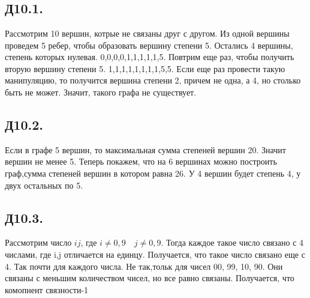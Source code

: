 

	\section*{}
	\subsection*{Д10.1.}
	Рассмотрим 10 вершин, котрые не связаны друг с другом. 
	Из одной вершины проведем 5 ребер, чтобы образовать вершину степени 5.
	Остались 4 вершины, степень которых нулевая. 0,0,0,0,1,1,1,1,1,5. Повтрим еще раз, чтобы получить вторую вершину степени 5.  1,1,1,1,1,1,1,1,5,5. Если еще раз провести такую манипуляцию, то получится вершина степени 2, причем не одна, а 4, но столько быть не может. Значит, такого графа не существует.
	\subsection*{Д10.2.}
	Если в графе 5 вершин, то максимальная сумма степеней вершин 20. Значит вершин не менее 5. Теперь покажем, что на 6 вершинах можно построить граф,сумма степеней вершин в котором равна 26. У 4 вершин будет степень 4, у двух остальных по 5.
	\subsection*{Д10.3.}
	Рассмотрим число $ij$, где $i \ne 0,9 \quad j\ne0,9$. Тогда каждое такое число связано с 4 числами, где i,j отличается на единцу. Получается, что такое число связано еще с 4. Так почти для каждого числа. Не так,тольк для чисел 00, 99, 10, 90. Они связаны с меньшим количеством чисел, но все равно связаны. Получается, что комопнент связности-1 
